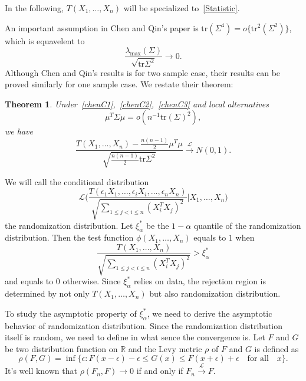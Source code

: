 \documentclass[review]{elsarticle}
\theoremstyle{plain}
\newtheorem{theorem}{\quad\quad Theorem}
\theoremstyle{definition}
\theoremstyle{remark}
\begin{document}
In the following, $T(X_1,\ldots, X_n)$ will be specialized to~\eqref{Statistic}.

An important assumption in Chen and Qin's paper is
    $\mathrm{tr}(\Sigma^4)=o\{\mathrm{tr}^2(\Sigma^2)\}$,
which is equavelent to 
\begin{equation}\label{chenC3}
    \frac{\lambda_{\max}(\Sigma)}{\sqrt{\mathrm{tr}\Sigma^2}}\to 0.
\end{equation}
Although Chen and Qin's results is for two sample case, their results can be proved similarly for one sample case. We restate their theorem:
\begin{theorem}\label{theoremChen}
    Under~\eqref{chenC1},~\eqref{chenC2},~\eqref{chenC3} and local alternatives
    \begin{equation}\label{mu1}
        \mu^T \Sigma\mu=o(n^{-1}\mathrm{tr}(\Sigma)^2),
    \end{equation}
    we have
    \begin{equation}
        \frac{T(X_1,\ldots,X_n)-\frac{n(n-1)}{2}\mu^T\mu}{\sqrt{\frac{n(n-1)}{2}\mathrm{tr}\Sigma^2}}\xrightarrow{\mathcal{L}}N(0,1).
    \end{equation}
\end{theorem}

We will call the conditional distribution
\begin{equation*}
        \mathcal{L}\Big(\frac{T(\epsilon_1 X_1,\ldots, \epsilon_i X_i,\ldots,\epsilon_n X_n)}{\sqrt{\sum_{1\leq j<i\leq n}{(X_i^T X_j)}^2}}\Big|X_1,\ldots,X_n\Big)
\end{equation*}
the randomization distribution.
Let $\xi^*_{\alpha}$ be the $1-\alpha$ quantile of the randomization distribution.
Then the test function $\phi(X_1,\ldots,X_n)$ equals to $1$ when 
$$
\frac{T(X_1,\ldots, X_n)}{\sqrt{\sum_{1\leq j<i\leq n}{(X_i^T X_j)}^2}}> \xi^*_{\alpha}
$$
and equals to $0$ otherwise.
Since $\xi^*_{\alpha}$ relies on data, the rejection region is determined by not only  $T(X_1,\ldots,X_n)$ but also randomization distribution.

To study the asymptotic property of $\xi^*_{\alpha}$, we need to derive the asymptotic behavior of randomization distribution.
Since the randomization distribution itself is random, we need to define in what sence the convergence is. Let $F$ and $G$ be two distribution function on $\mathbb{R}$ and the Levy metric $\rho$ of $F$ and $G$ is defined as
\begin{equation*}
    \rho(F,G)=\inf\{\epsilon:F(x-\epsilon)-\epsilon\leq G(x)\leq F(x+\epsilon)+\epsilon\quad  \textrm{for all}\quad x\}.
\end{equation*}
It's well known that $\rho(F_n,F)\to 0$ if and only if  $F_n\xrightarrow{\mathcal{L}}F$.
\end{document}
